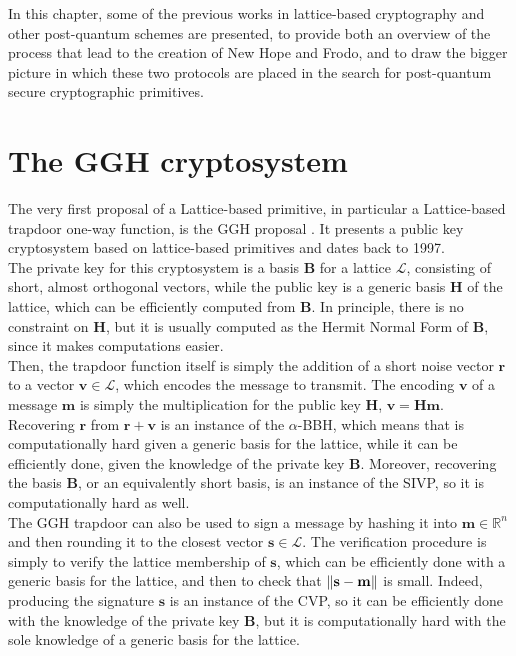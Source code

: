 In this chapter, some of the previous works in lattice-based cryptography and other post-quantum schemes are presented, to provide both an overview of the process that lead to the creation of New Hope and Frodo, and to draw the bigger picture in which these two protocols are placed in the search for post-quantum secure cryptographic primitives.

\section{The GGH cryptosystem}
The very first proposal of a Lattice-based primitive, in particular a Lattice-based trapdoor one-way function, is the GGH proposal \cite{GGH}. It presents a public key cryptosystem based on lattice-based primitives and dates back to 1997.\\
The private key for this cryptosystem is a basis $\mathbf{B}$ for a lattice $\mathscr{L}$, consisting of short, almost orthogonal vectors, while the public key is a generic basis $\mathbf{H}$ of the lattice, which can be efficiently computed from $\mathbf{B}$. In principle, there is no constraint on $\mathbf{H}$, but it is usually computed as the Hermit Normal Form of $\mathbf{B}$, since it makes computations easier.\\
Then, the trapdoor function itself is simply the addition of a short noise vector $\mathbf{r}$ to a vector $\mathbf{v}\in\mathscr{L}$, which encodes the message to transmit. The encoding $\mathbf{v}$ of a message $\mathbf{m}$ is simply the multiplication for the public key $\mathbf{H}$,  $\mathbf{v}=\mathbf{H}\mathbf{m}$. Recovering $\mathbf{r}$ from $\mathbf{r}+\mathbf{v}$ is an instance of the $\alpha$-BBH, which means that is computationally hard given a generic basis for the lattice, while it can be efficiently done, given the knowledge of the private key $\mathbf{B}$.
Moreover, recovering the basis $\mathbf{B}$, or an equivalently short basis, is an instance of the SIVP, so it is computationally hard as well.\\
The GGH trapdoor can also be used to sign a message by hashing it into $\mathbf{m}\in\mathbb{R}^n$ and then rounding it to the closest vector $\mathbf{s}\in\mathscr{L}$. The verification procedure is simply to verify the lattice membership of $\mathbf{s}$, which can be efficiently done with a generic basis for the lattice, and then to check that $\left\lVert \mathbf{s}-\mathbf{m} \right\rVert$ is small. Indeed, producing the signature $\mathbf{s}$ is an instance of the CVP, so it can be efficiently done with the knowledge of the private key $\mathbf{B}$, but it is computationally hard with the sole knowledge of a generic basis for the lattice.\\
